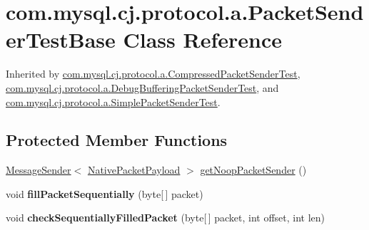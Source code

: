 \hypertarget{classcom_1_1mysql_1_1cj_1_1protocol_1_1a_1_1_packet_sender_test_base}{}\section{com.\+mysql.\+cj.\+protocol.\+a.\+Packet\+Sender\+Test\+Base Class Reference}
\label{classcom_1_1mysql_1_1cj_1_1protocol_1_1a_1_1_packet_sender_test_base}


Inherited by \mbox{\hyperlink{classcom_1_1mysql_1_1cj_1_1protocol_1_1a_1_1_compressed_packet_sender_test}{com.\+mysql.\+cj.\+protocol.\+a.\+Compressed\+Packet\+Sender\+Test}}, \mbox{\hyperlink{classcom_1_1mysql_1_1cj_1_1protocol_1_1a_1_1_debug_buffering_packet_sender_test}{com.\+mysql.\+cj.\+protocol.\+a.\+Debug\+Buffering\+Packet\+Sender\+Test}}, and \mbox{\hyperlink{classcom_1_1mysql_1_1cj_1_1protocol_1_1a_1_1_simple_packet_sender_test}{com.\+mysql.\+cj.\+protocol.\+a.\+Simple\+Packet\+Sender\+Test}}.

\subsection*{Protected Member Functions}
\begin{DoxyCompactItemize}
\item 
\mbox{\hyperlink{interfacecom_1_1mysql_1_1cj_1_1protocol_1_1_message_sender}{Message\+Sender}}$<$ \mbox{\hyperlink{classcom_1_1mysql_1_1cj_1_1protocol_1_1a_1_1_native_packet_payload}{Native\+Packet\+Payload}} $>$ \mbox{\hyperlink{classcom_1_1mysql_1_1cj_1_1protocol_1_1a_1_1_packet_sender_test_base_a0e37ea21e80f4299d9114934ea4ac93e}{get\+Noop\+Packet\+Sender}} ()
\item 
\mbox{\label{classcom_1_1mysql_1_1cj_1_1protocol_1_1a_1_1_packet_sender_test_base_a4e7af30941b642cb3eced44a17ec6bdd}} 
void {\bfseries fill\+Packet\+Sequentially} (byte\mbox{[}$\,$\mbox{]} packet)
\item 
\mbox{\label{classcom_1_1mysql_1_1cj_1_1protocol_1_1a_1_1_packet_sender_test_base_adf72fe0033db0785a443b5ca4a4afdad}} 
void {\bfseries check\+Sequentially\+Filled\+Packet} (byte\mbox{[}$\,$\mbox{]} packet, int offset, int len)
\end{DoxyCompactItemize}


